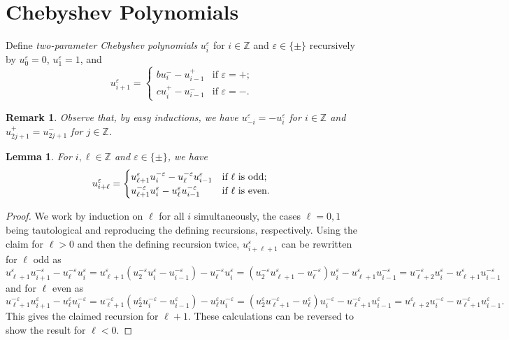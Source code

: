 \documentclass{amsart}
\newtheorem{lemma}[theorem]{Lemma}
\newtheorem{remark}[theorem]{Remark}
\numberwithin{theorem}{section}
\newcommand{\ZZ}{\mathbb{Z}}
\begin{document}
\section{Chebyshev Polynomials}
  \label{sec:chebyshev}
  Define \emph{two-parameter Chebyshev polynomials} $u_i^\varepsilon$ for $i\in\ZZ$ and $\varepsilon\in\{\pm\}$ recursively by $u_0^\varepsilon=0$, $u_1^\varepsilon=1$, and
  \[u_{i+1}^\varepsilon=\begin{cases} bu_i^- -u_{i-1}^+ & \text{if $\varepsilon=+$;}\\ cu_i^+-u_{i-1}^- & \text{if $\varepsilon=-$.} \end{cases}\]
  \begin{remark}
    \label{rem:equivalences}
    Observe that, by easy inductions, we have $u_{-i}^\varepsilon=-u_i^\varepsilon$ for $i\in\ZZ$ and $u_{2j+1}^+=u_{2j+1}^-$ for $j\in\ZZ$.
  \end{remark}

  \begin{lemma}
    For $i,\ell\in\ZZ$ and $\varepsilon\in\{\pm\}$, we have
    \begin{equation}
      \label{eq:long Chebyshev recursion}
      u_{i+\ell}^\varepsilon=\begin{cases} u_{\ell+1}^\varepsilon u_i^{-\varepsilon}-u_\ell^{-\varepsilon} u_{i-1}^\varepsilon & \text{\upshape if $\ell$ is odd;}\\ u_{\ell+1}^{-\varepsilon} u_i^\varepsilon-u_\ell^\varepsilon u_{i-1}^{-\varepsilon} & \text{\upshape if $\ell$ is even.} \end{cases}
    \end{equation}
  \end{lemma}
  \begin{proof}
    We work by induction on $\ell$ for all $i$ simultaneously, the cases $\ell=0,1$ being tautological and reproducing the defining recursions, respectively.
    Using the claim for $\ell>0$ and then the defining recursion twice, $u_{i+\ell+1}^\varepsilon$ can be rewritten for $\ell$ odd as
    \[
      u_{\ell+1}^\varepsilon u_{i+1}^{-\varepsilon}-u_\ell^{-\varepsilon} u_i^\varepsilon
      =u_{\ell+1}^\varepsilon(u_2^{-\varepsilon}u_i^\varepsilon-u_{i-1}^{-\varepsilon}) -u_\ell^{-\varepsilon} u_i^\varepsilon 
      =(u_2^{-\varepsilon} u_{\ell+1}^\varepsilon-u_\ell^{-\varepsilon}) u_i^\varepsilon-u_{\ell+1}^\varepsilon u_{i-1}^{-\varepsilon}
      =u_{\ell+2}^{-\varepsilon} u_i^\varepsilon - u_{\ell+1}^\varepsilon u_{i-1}^{-\varepsilon}
    \]
    and for $\ell$ even as
    \[
      u_{\ell+1}^{-\varepsilon} u_{i+1}^\varepsilon-u_\ell^\varepsilon u_i^{-\varepsilon}
      =u_{\ell+1}^{-\varepsilon}(u_2^\varepsilon u_i^{-\varepsilon}-u_{i-1}^\varepsilon) -u_\ell^\varepsilon u_i^{-\varepsilon}
      =(u_2^\varepsilon u_{\ell+1}^{-\varepsilon}-u_\ell^\varepsilon) u_i^{-\varepsilon}-u_{\ell+1}^{-\varepsilon} u_{i-1}^\varepsilon
      =u_{\ell+2}^\varepsilon u_i^{-\varepsilon}-u_{\ell+1}^{-\varepsilon} u_{i-1}^\varepsilon.
    \]
    This gives the claimed recursion for $\ell+1$.
    These calculations can be reversed to show the result for $\ell<0$.
  \end{proof}
\end{document}
